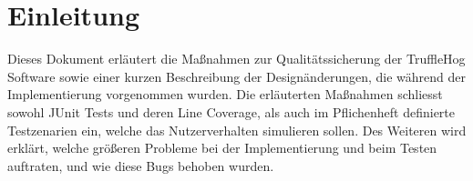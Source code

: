 \chapter{Einleitung}

Dieses Dokument erläutert die Maßnahmen zur Qualitätssicherung der TruffleHog Software sowie einer kurzen Beschreibung der Designänderungen, die während der Implementierung vorgenommen wurden.
Die erläuterten Maßnahmen schliesst sowohl JUnit Tests und deren Line Coverage, als auch im Pflichenheft definierte Testzenarien ein, welche das Nutzerverhalten simulieren sollen. Des Weiteren wird erklärt, welche größeren Probleme bei der Implementierung und beim Testen auftraten, und wie diese Bugs behoben wurden. 